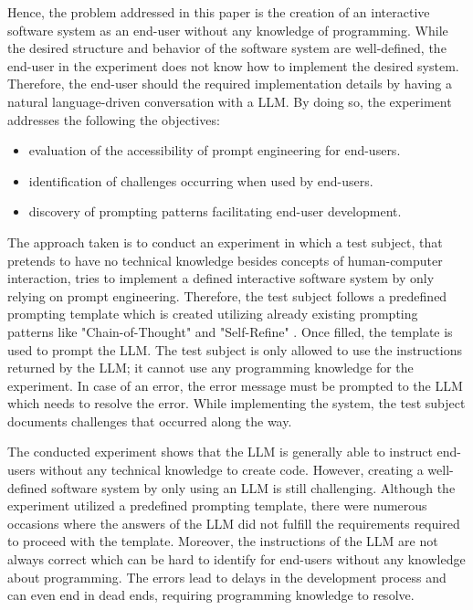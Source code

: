 \documentclass[acsmall,screen]{acmart}
\begin{document}
Hence, the problem addressed in this paper is the creation of an interactive software system as an end-user without any knowledge of programming. While the desired structure and behavior of the software system are well-defined, the end-user in the experiment does not know how to implement the desired system. Therefore, the end-user should the required implementation details by having a natural language-driven conversation with a LLM. By doing so, the experiment  addresses the following the objectives:
\begin{itemize}
\item evaluation of the accessibility of prompt engineering for end-users.
\item identification of challenges occurring when used by end-users.
\item discovery of prompting patterns facilitating end-user development.
\end{itemize}

The approach taken is to conduct an experiment in which a test subject, that pretends to have no technical knowledge besides concepts of human-computer interaction, tries to implement a defined interactive software system by only relying on prompt engineering. Therefore, the test subject follows a predefined prompting template which is created utilizing already existing prompting patterns like "Chain-of-Thought" \cite{wei_chain--thought_2022}   and "Self-Refine" \cite{madaan_self-refine_2023}. Once filled, the template is used to prompt the LLM. The test subject is only allowed to use the instructions returned by the LLM; it cannot use any programming knowledge for the experiment. In case of an error, the error message must be prompted to the LLM which needs to resolve the error. While implementing the system, the test subject documents challenges that occurred along the way. 

The conducted experiment shows that the LLM is generally able to instruct end-users without any technical knowledge to create code. However, creating a well-defined software system by only using an LLM is still challenging. Although the experiment utilized a predefined prompting template, there were numerous occasions where the answers of the LLM did not fulfill the requirements required to proceed with the template. Moreover, the instructions of the LLM are not always correct which can be hard to identify for end-users without any knowledge about programming. The errors lead to delays in the development process and can even end in dead ends, requiring programming knowledge to resolve.
\end{document}
